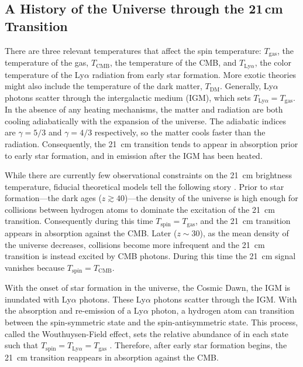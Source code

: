 \begin{bibunit}
\section{A History of the Universe through the 21\,cm Transition}

There are three relevant temperatures that affect the spin temperature: $T_\text{gas}$, the
temperature of the gas, $T_\text{CMB}$, the temperature of the CMB, and $T_{\text{Ly}\alpha}$, the
color temperature of the Ly$\alpha$ radiation from early star formation. More exotic theories might
also include the temperature of the dark matter, $T_\text{DM}$. Generally, Ly$\alpha$ photons
scatter through the intergalactic medium (IGM), which sets $T_{\text{Ly}\alpha} = T_\text{gas}$. In
the absence of any heating mechanisms, the matter and radiation are both cooling adiabatically with
the expansion of the universe.  The adiabatic indices are $\gamma = 5/3$ and $\gamma = 4/3$
respectively, so the matter cools faster than the radiation. Consequently, the 21~cm transition
tends to appear in absorption prior to early star formation, and in emission after the IGM has been
heated.

While there are currently few observational constraints on the 21~cm brightness temperature,
fiducial theoretical models tell the following story \citep[e.g.,][]{2006PhR...433..181F,
2012RPPh...75h6901P}.  Prior to star formation---the dark ages ($z \gtrsim 40$)---the density of the
universe is high enough for collisions between hydrogen atoms to dominate the excitation of the
21~cm transition.  Consequently during this time $T_\text{spin} = T_\text{gas}$, and the 21~cm
transition appears in absorption against the CMB.  Later ($z \sim 30$), as the mean density of the
universe decreases, collisions become more infrequent and the 21~cm transition is instead excited by
CMB photons. During this time the 21~cm signal vanishes because $T_\text{spin} = T_\text{CMB}$.

With the onset of star formation in the universe, the Cosmic Dawn, the IGM is inundated with
Ly$\alpha$ photons.  These Ly$\alpha$ photons scatter through the IGM. With the absorption and
re-emission of a Ly$\alpha$ photon, a hydrogen atom can transition between the spin-symmetric state
and the spin-antisymmetric state. This process, called the Wouthuysen-Field effect, sets the
relative abundance of  in each state such that $T_\text{spin} = T_{\text{Ly}\alpha} =
T_\text{gas}$ \citep{1952AJ.....57R..31W,1958PIRE...46..240F}. Therefore, after early star formation
begins, the 21~cm transition reappears in absorption against the CMB.


\end{bibunit}
